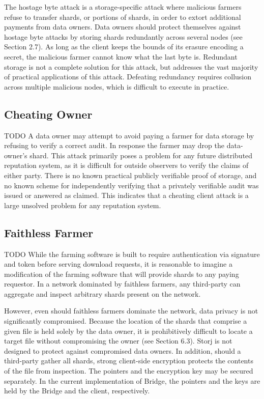 \documentclass[a4paper,10pt]{article} \usepackage[utf8]{inputenc}
\newcommand{\todo}[1]{{\color{red} TODO #1 }}
\begin{document}
The hostage byte attack is a storage-specific attack where malicious farmers
refuse to transfer shards, or portions of shards, in order to extort additional
payments from data owners. Data owners should protect themselves against hostage
byte attacks by storing shards redundantly across several nodes (see Section
2.7). As long as the client keeps the bounds of its erasure encoding a secret,
the malicious farmer cannot know what the last byte is. Redundant storage is not
a complete solution for this attack, but addresses the vast majority of
practical applications of this attack. Defeating redundancy requires collusion
across multiple malicious nodes, which is difficult to execute in practice.

\subsection{Cheating Owner}

\todo{ A data owner may attempt to avoid paying a farmer for data storage by
refusing to verify a correct audit. In response the farmer may drop the
data-owner's shard. This attack primarily poses a problem for any future
distributed reputation system, as it is difficult for outside observers to
verify the claims of either party. There is no known practical publicly
verifiable proof of storage, and no known scheme for independently verifying
that a privately verifiable audit was issued or answered as claimed. This
indicates that a cheating client attack is a large unsolved problem for any
reputation system. }

\subsection{Faithless Farmer}

\todo{ While the farming software is built to require authentication via
signature and token before serving download requests, it is reasonable to
imagine a modification of the farming software that will provide shards to any
paying requestor. In a network dominated by faithless farmers, any third-party
can aggregate and inspect arbitrary shards present on the network.

However, even should faithless farmers dominate the network, data privacy is not
significantly compromised. Because the location of the shards that comprise a
given file is held solely by the data owner, it is prohibitively difficult to
locate a target file without compromising the owner (see Section 6.3). Storj is
not designed to protect against compromised data owners. In addition, should a
third-party gather all shards, strong client-side encryption protects the
contents of the file from inspection. The pointers and the encryption key may be
secured separately. In the current implementation of Bridge, the pointers and
the keys are held by the Bridge and the client, respectively. }
\end{document}
